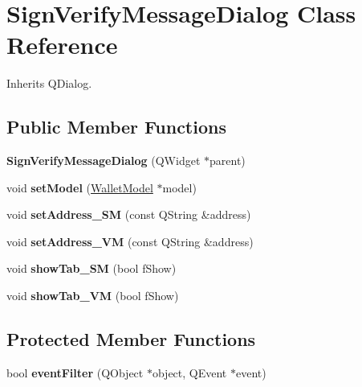 \hypertarget{class_sign_verify_message_dialog}{}\section{Sign\+Verify\+Message\+Dialog Class Reference}
\label{class_sign_verify_message_dialog}


Inherits Q\+Dialog.

\subsection*{Public Member Functions}
\begin{DoxyCompactItemize}
\item 
\mbox{\label{class_sign_verify_message_dialog_a04d74fa38e87dc6213237567a6528f28}} 
{\bfseries Sign\+Verify\+Message\+Dialog} (Q\+Widget $\ast$parent)
\item 
\mbox{\label{class_sign_verify_message_dialog_ad1479ca27c2fd7d6fd1160c41660ea84}} 
void {\bfseries set\+Model} (\mbox{\hyperlink{class_wallet_model}{Wallet\+Model}} $\ast$model)
\item 
\mbox{\label{class_sign_verify_message_dialog_a5fc13a7072e3667c91d7e984da09eac2}} 
void {\bfseries set\+Address\+\_\+\+SM} (const Q\+String \&address)
\item 
\mbox{\label{class_sign_verify_message_dialog_af30557fd4bc0aa57940d0f20e34c04ec}} 
void {\bfseries set\+Address\+\_\+\+VM} (const Q\+String \&address)
\item 
\mbox{\label{class_sign_verify_message_dialog_a3b06ea85a2640312e0074d8dabce6416}} 
void {\bfseries show\+Tab\+\_\+\+SM} (bool f\+Show)
\item 
\mbox{\label{class_sign_verify_message_dialog_a6db3c37d3f5a3c070daed2c731cc79d5}} 
void {\bfseries show\+Tab\+\_\+\+VM} (bool f\+Show)
\end{DoxyCompactItemize}
\subsection*{Protected Member Functions}
\begin{DoxyCompactItemize}
\item 
\mbox{\label{class_sign_verify_message_dialog_a0e6755f1a4f2688b8e3b24a1f9b118b0}} 
bool {\bfseries event\+Filter} (Q\+Object $\ast$object, Q\+Event $\ast$event)
\end{DoxyCompactItemize}


